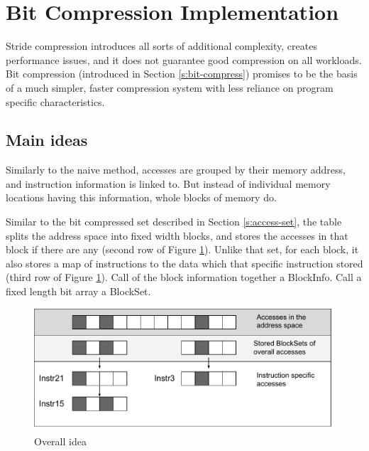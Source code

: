 \documentclass[12pt,twoside]{reedthesis}
\begin{document}
			
		
			
			
					
		\section{Bit Compression Implementation}
			
			Stride compression introduces all sorts of additional complexity, creates performance issues, and it does not guarantee good compression on all workloads. Bit compression (introduced in Section \ref{s:bit-compress}) promises to be the basis of a much simpler, faster compression system with less reliance on program specific characteristics. 
			
			
			\subsection{Main ideas}
			
			Similarly to the naive method, accesses are grouped by their memory address, and instruction information is linked to. But instead of individual memory locations having this information, whole blocks of memory do. %
			
			Similar to the bit compressed set described in Section \ref{s:access-set}, the table splits the address space into fixed width blocks, and stores the accesses in that block if there are any (second row of Figure \ref{fig:bit-idea}). Unlike that set, for each block, it also stores a map of instructions to the data which that specific instruction stored (third row of Figure \ref{fig:bit-idea}). Call of the block information together a BlockInfo. Call a fixed length bit array a BlockSet. 
			
			\begin{figure}[h]
				\caption{Overall idea}
				\label{fig:bit-idea}
				\includegraphics[scale=0.85]{BlockSet_accesses.pdf}
			\end{figure}
			
\end{document}
